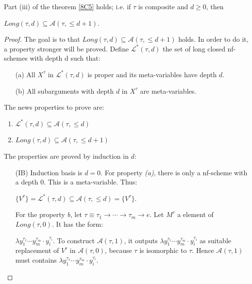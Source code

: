 \documentclass[a4paper,10pt]{article}
\begin{document}
\begin{lem}\label{8F1} Part (iii) of the theorem \ref{8C5} holds; i.e. if $\tau$ is composite and $d \geq 0$, then
\begin{center}
 $Long(\tau,d) \subseteq \mathcal{A}(\tau, \leq d + 1)$.
\end{center}

\begin{proof}
     The goal is to that $Long(\tau,d) \subseteq \mathcal{A}(\tau, \leq d +1)$ holds.
      In order to do it, a property stronger will be proved. Define
      $\mathcal{L}^*(\tau,d)$ the set of long closed nf-schemes with depth d
      such that:
      
      \begin{itemize}
             \item[(a)] All $X^{\tau}$ in $\mathcal{L}^*(\tau,d)$ is
               proper and its meta-variables have depth $d$.
             \item[(b)] All subarguments with depth $d$ in $X^{\tau}$
               are meta-variables.
      \end{itemize}
      
      The news properties to prove are:

      \begin{enumerate}
             \item $\mathcal{L}^*(\tau,d) \subseteq
               \mathcal{A}(\tau,\leq d)$
             \item $Long(\tau,d) \subseteq \mathcal{A}(\tau, \leq d +1)$
       \end{enumerate}

       The properties are proved by induction in $d$:

       \begin{itemize}
               \item[(IB)] Induction basis is $d = 0$. For property
                 {\em (a)}, there is only a nf-scheme with a depth $0$. This is
                 a meta-variable. Thus:

                 $\{V^{\tau}\}=\mathcal{L}^*(\tau,d) \subseteq
               \mathcal{A}(\tau,\leq d) = \{V^{\tau}\}$.

               For the property {\em b}, let $\tau \equiv \tau_1 \to \cdots
               \to \tau_m \to e$. Let $M^{\tau}$ a element of
               $Long(\tau,0)$. It has the form:

               $\lambda y^{\tau_1}_1 \cdots y^{\tau_m}_m \cdot
               y^{\tau_i}_i$. To construct $\mathcal{A}(\tau, 1)$, it
               outputs $\lambda y^{\tau_1}_1 \cdots y^{\tau_m}_m \cdot
               y^{\tau_i}_i$ as suitable replacement of $V^{\tau}$ in
               $\mathcal{A}(\tau,0)$, because $\tau$ is isomorphic to
               $\tau$. Hence $\mathcal{A}(\tau,1)$ must contains $\lambda y^{\tau_1}_1 \cdots y^{\tau_m}_m \cdot
               y^{\tau_i}_i$.


\end{itemize}
\end{proof}
\end{lem}
\end{document}
